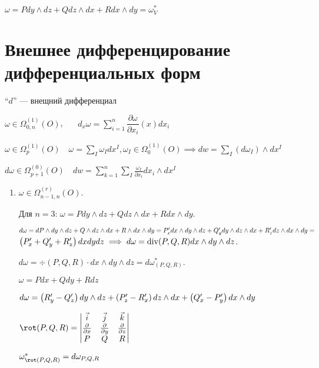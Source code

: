 \begin{example}
\begin{enumerate}
        $\omega = Pdy\wedge dz + Qdz\wedge dx + Rdx\wedge dy = \omega^*_V$
    \end{enumerate}
\end{example}

\section{Внешнее дифференцирование дифференциальных форм}

``$d$'' --- внещний дифференциал

\begin{definition}
    $\omega  \in \Omega^{(1)}_{0, n} (O)$,~~~ $d_x \omega = \sum_{i=1}^n \dfrac{\partial \omega}{\partial x_i} (x) d x_i$ 


    $\omega \in \Omega_p^(1)(O)\quad \omega = \sum_I \omega_Idx^I, \omega_I\in \Omega_0^{(1)}(O) \implies dw = \sum _I (d\omega_I)\wedge dx^I$
    
    $d\omega \in \Omega_{p+1}^{(0)}(O)\quad dw = \sum_{k=1}^{n} \sum_I \frac{\omega_I}{\partial x_i} dx_i\wedge dx^I$
\end{definition}

\begin{example}
    \begin{enumerate}
        \item $\omega  \in \Omega_{n-1, n}^{(r)} (O)$.
        
        Для $n = 3$:
        $\omega = P dy \wedge dz + Q dz \wedge dx + R dx \wedge dy$.
        
        $d\omega = dP \wedge dy \wedge dz + Q \wedge dz \wedge dx + R \wedge dx \wedge dy = P^{\prime}_x dx \wedge dy \wedge dz + Q^{\prime}_y dy \wedge dz \wedge dx + R^{\prime}_z dz \wedge dx \wedge dy = $\\
        $ \left( P^{\prime}_x + Q^{\prime}_y + R^{\prime}_z \right) dx dy dz \implies d\omega = \mathrm{div} (P, Q, R) dx \wedge dy \wedge dz$.


    
        $d\omega = \div(P,Q,R)\cdot dx\wedge dy\wedge dz = d \omega_{(P, Q, R)}^{*}$.

        $\omega = Pdx + Qdy + Rdz$

        $d\omega = \left( R^{\prime}_y - Q^{\prime}_z \right)dy\wedge dz + \left( P^{\prime}_z - R^{\prime}_x \right) dz\wedge dx + \left( Q^{\prime}_x - P^{\prime}_y \right) dx\wedge dy $ 

        $\rot(P,Q,R) = \begin{vmatrix}
            \vec i & \vec j & \vec k\\
            \frac{\partial }{\partial x} & \frac{\partial }{\partial y} & \frac{\partial }{\partial z}\\    
            P&Q&R\\
        \end{vmatrix}$

        $\omega^*_{\rot(P,Q,R)} = d\omega_{P,Q,R}$
    \end{enumerate}
\end{example}

